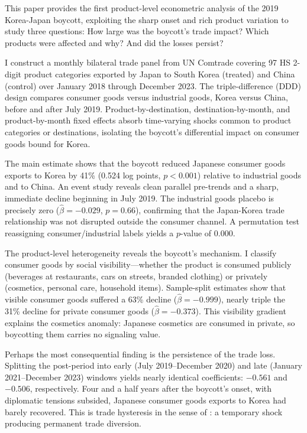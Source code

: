 \documentclass[12pt]{article}
\begin{document}
This paper provides the first product-level econometric analysis of the 2019 Korea-Japan boycott, exploiting the sharp onset and rich product variation to study three questions: How large was the boycott's trade impact? Which products were affected and why? And did the losses persist?

I construct a monthly bilateral trade panel from UN Comtrade covering 97 HS 2-digit product categories exported by Japan to South Korea (treated) and China (control) over January 2018 through December 2023. The triple-difference (DDD) design compares consumer goods versus industrial goods, Korea versus China, before and after July 2019. Product-by-destination, destination-by-month, and product-by-month fixed effects absorb time-varying shocks common to product categories or destinations, isolating the boycott's differential impact on consumer goods bound for Korea.

The main estimate shows that the boycott reduced Japanese consumer goods exports to Korea by 41\% (0.524 log points, $p < 0.001$) relative to industrial goods and to China. An event study reveals clean parallel pre-trends and a sharp, immediate decline beginning in July 2019. The industrial goods placebo is precisely zero ($\hat{\beta} = -0.029$, $p = 0.66$), confirming that the Japan-Korea trade relationship was not disrupted outside the consumer channel. A permutation test reassigning consumer/industrial labels yields a $p$-value of 0.000.

The product-level heterogeneity reveals the boycott's mechanism. I classify consumer goods by social visibility---whether the product is consumed publicly (beverages at restaurants, cars on streets, branded clothing) or privately (cosmetics, personal care, household items). Sample-split estimates show that visible consumer goods suffered a 63\% decline ($\hat{\beta} = -0.999$), nearly triple the 31\% decline for private consumer goods ($\hat{\beta} = -0.373$). This visibility gradient explains the cosmetics anomaly: Japanese cosmetics are consumed in private, so boycotting them carries no signaling value.

Perhaps the most consequential finding is the persistence of the trade loss. Splitting the post-period into early (July 2019--December 2020) and late (January 2021--December 2023) windows yields nearly identical coefficients: $-0.561$ and $-0.506$, respectively. Four and a half years after the boycott's onset, with diplomatic tensions subsided, Japanese consumer goods exports to Korea had barely recovered. This is trade hysteresis in the sense of \citet{baldwin1988hysteresis}: a temporary shock producing permanent trade diversion.
\end{document}
